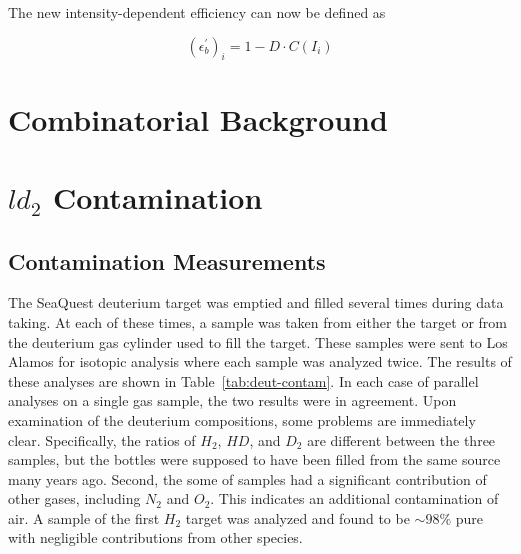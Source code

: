 The new intensity-dependent efficiency can now be defined as

\begin{equation}
(\epsilon_b^\prime)_i = 1 - D \cdot C(I_i)
\end{equation}

\section{Combinatorial Background}


\section{$ld_2$ Contamination}


\subsection{Contamination Measurements}

The SeaQuest deuterium target was emptied and filled several times during data taking. At each of these times, a sample was taken from either the target or from the deuterium gas cylinder used to fill the target. These samples were sent to Los Alamos for isotopic analysis where each sample was analyzed twice. The results of these analyses are shown in Table~\ref{tab:deut-contam}. In each case of parallel analyses on a single gas sample, the two results were in agreement. Upon examination of the deuterium compositions, some problems are immediately clear. Specifically, the ratios of $H_2$, $HD$, and $D_2$ are different between the three samples, but the bottles were supposed to have been filled from the same source many years ago. Second, the some of samples had a significant contribution of other gases, including $N_2$ and $O_2$. This indicates an additional contamination of air. A sample of the first $H_2$ target was analyzed and found to be $\sim98\%$ pure with negligible contributions from other species.

